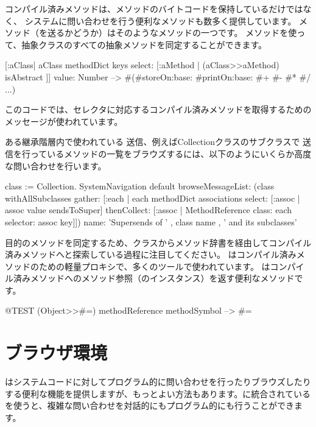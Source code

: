 \documentclass[a4paper,10pt,twoside]{book}
\begin{document}
コンパイル済みメソッドは、メソッドのバイトコードを保持しているだけではなく、
システムに問い合わせを行う便利なメソッドも数多く提供しています。
メソッド（を送るかどうか）はそのようなメソッドの一つです。
メソッドを使って、抽象クラスのすべての抽象メソッドを同定することができます。
\begin{code}{}
[:aClass| aClass methodDict keys select: [:aMethod |
  (aClass>>aMethod) isAbstract ]] value: Number
  --> #(#storeOn:base: #printOn:base: #+ #- #* #/ ...)
\end{code}
このコードでは、セレクタに対応するコンパイル済みメソッドを取得するための\ct{>>}メッセージが使われています。


ある継承階層内で使われている \super 送信、例えばCollectionクラスのサブクラスで \super 送信を行っているメソッドの一覧をブラウズするには、以下のようにいくらか高度な問い合わせを行います。
\begin{code}{}
class := Collection.
SystemNavigation default
  browseMessageList: (class withAllSubclasses gather: [:each |
    each methodDict associations
      select: [:assoc | assoc value sendsToSuper]
      thenCollect: [:assoc | MethodReference class: each selector: assoc key]])
  name: 'Supersends of ' , class name , ' and its subclasses'
\end{code}
目的のメソッドを同定するため、クラスからメソッド辞書を経由してコンパイル済みメソッドへと探索している過程に注目してください。
はコンパイル済みメソッドのための軽量プロキシで、多くのツールで使われています。
はコンパイル済みメソッドへのメソッド参照（のインスタンス）を返す便利なメソッドです。
\begin{code}{@TEST}
(Object>>#=) methodReference methodSymbol --> #=
\end{code}

\section{ブラウザ環境}

はシステムコードに対してプログラム的に問い合わせを行ったりブラウズしたりする便利な機能を提供しますが、もっとよい方法もあります。\pharo に統合されているを使うと、複雑な問い合わせを対話的にもプログラム的にも行うことができます。
\end{document}
